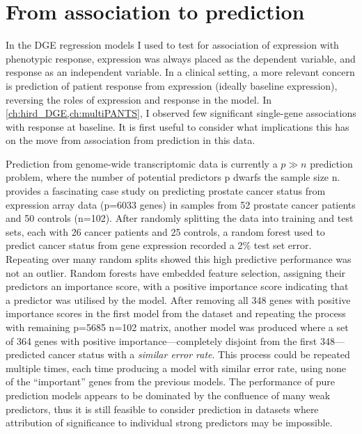 \section{From association to prediction}

In the \gls{DGE} regression models I used to test for association of expression with phenotypic response,
expression was always placed as the dependent variable, 
and response as an independent variable.
In a clinical setting, a more relevant concern is prediction of patient response from expression (ideally baseline expression),
reversing the roles of expression and response in the model.
In \cref{ch:hird_DGE,ch:multiPANTS},
I observed few significant single-gene associations with response at baseline.
It is first useful to consider what implications this has on the move from association from prediction in this data.

Prediction from genome-wide transcriptomic data is currently a $p \gg n$ prediction problem,
where the number of potential predictors p dwarfs the sample size n.
\textcite{efron2020PredictionEstimationAttribution} provides a fascinating case study on predicting prostate cancer status from expression array data (p=6033 genes) in 
samples from 52 prostate cancer patients and 50 controls (n=102).
After randomly splitting the data into training and test sets, each with 26 cancer patients and 25 controls,
a random forest used to predict cancer status from gene expression recorded a 2\% test set error.
Repeating over many random splits showed this high predictive performance was not an outlier.
Random forests have embedded feature selection, assigning their predictors an importance score, 
with a positive importance score indicating that a predictor was utilised by the model.
After removing all 348 genes with positive importance scores in the first model from the dataset and repeating the process with remaining p=5685 n=102 matrix,
another model was produced where a set of 364 genes with positive importance---completely disjoint from the first 348---predicted cancer status with a \emph{similar error rate}.
This process could be repeated multiple times, each time producing a model with similar error rate, using none of the \enquote{important} genes from the previous models.
The performance of pure prediction models appears to be dominated by the confluence of many weak predictors,
thus it is still feasible to consider prediction in datasets where attribution of significance to individual strong predictors may be impossible.

